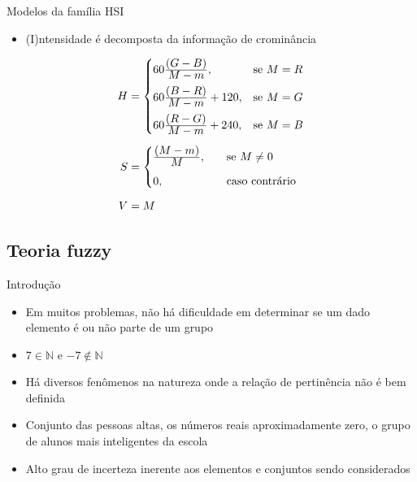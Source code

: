 \begin{frame}{Modelos da família HSI}
\begin{itemize}
    \item  (I)ntensidade é decomposta da informação de crominância
\end{itemize}
\begin{align*}
\begin{split}
  H &=  \begin{cases}
            60\frac{\displaystyle (G - B)}{\displaystyle M - m}, & \text{se}\ M = R\\[0.7em]
            60\frac{\displaystyle (B - R)}{\displaystyle M - m} + 120, & \text{se}\ M = G\\[0.7em]
            60\frac{\displaystyle (R - G)}{\displaystyle M - m} + 240, & \text{se}\ M = B
       \end{cases}
  \\[0.5em]
  S &=  \begin{cases}
            \frac{\displaystyle (M - m)}{\displaystyle M}, \quad &\text{se}\ M \neq 0\\[0.7em]
            0, \quad &\text{caso contrário}\\
       \end{cases}
  \\[0.5em]
  V &= M
\end{split}
\end{align*}
\end{frame}

\subsection{Teoria fuzzy}
\begin{frame}{Introdução}
\begin{itemize}
    \item Em muitos problemas, não há dificuldade em determinar se um dado elemento é ou não parte de um grupo
    \item $7 \in \mathbb{N}$ e $-7 \notin \mathbb{N}$
    \item Há diversos fenômenos na natureza onde a relação de pertinência não é bem definida \citep{pedrycz:98}
    \item Conjunto das pessoas altas, os números reais aproximadamente zero, o grupo de alunos mais inteligentes da escola
    \item Alto grau de incerteza inerente aos elementos e conjuntos sendo considerados
\end{itemize}
\end{frame}

